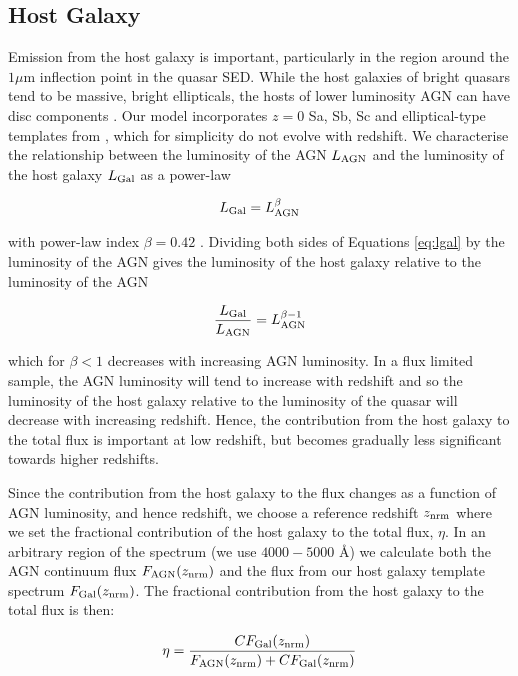 \subsection{Host Galaxy}

Emission from the host galaxy is important, particularly in the region around the $1\mu$m inflection point in the quasar SED. While the host galaxies of bright quasars tend to be massive, bright ellipticals, the hosts of lower luminosity AGN can have disc components \citep[e.g.][]{dunlop03}. Our model incorporates $z=0$ Sa, Sb, Sc and elliptical-type templates from \citet{mannucci01}, which for simplicity do not evolve with redshift. We characterise the relationship between the luminosity of the AGN $L_{\rm AGN}$ and the luminosity of the host galaxy $L_{\rm Gal}$ as a power-law

\begin{eqnarray}
  \label{eq:lgal}
  L_{\rm Gal} = L_{\rm AGN}^{\beta} 
\end{eqnarray}

with power-law index $\beta=0.42$ \citep{maddox06}. Dividing both sides of Equations \ref{eq:lgal} by the luminosity of the AGN gives the luminosity of the host galaxy relative to the luminosity of the AGN

\begin{eqnarray}
  \frac{L_{\rm Gal}}{L_{\rm AGN}} = L_{\rm AGN}^{\beta - 1} 
\end{eqnarray}

which for $\beta < 1$ decreases with increasing AGN luminosity. In a flux limited sample, the AGN luminosity will tend to increase with redshift and so the luminosity of the host galaxy relative to the luminosity of the quasar will decrease with increasing redshift. Hence, the contribution from the host galaxy to the total flux is important at low redshift, but becomes gradually less significant towards higher redshifts. 

Since the contribution from the host galaxy to the flux changes as a function of AGN luminosity, and hence redshift, we choose a reference redshift $z_{\rm nrm}$ where we set the fractional contribution of the host galaxy to the total flux, $\eta$. In an arbitrary region of the spectrum (we use $4000 - 5000$ \AA) we calculate both the AGN continuum flux $F_{\rm AGN}(z_{\rm nrm})$ and the flux from our host galaxy template spectrum $F_{\rm Gal}(z_{\rm nrm})$. The fractional contribution from the host galaxy to the total flux is then:

\begin{eqnarray}
  \label{eq:eta}
  \eta = \frac{CF_{\rm Gal}(z_{\rm nrm})}{F_{\rm AGN}(z_{\rm nrm}) + CF_{\rm Gal}(z_{\rm nrm})}
\end{eqnarray}

